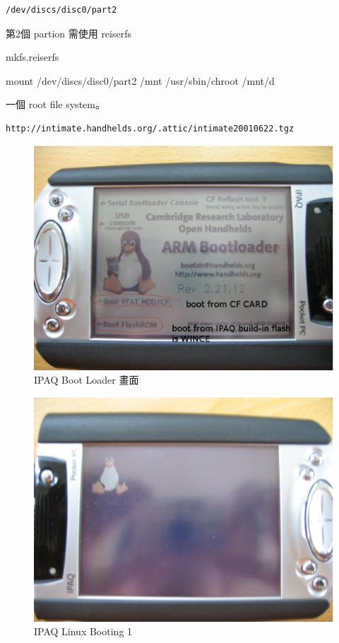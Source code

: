\documentclass[12pt,a4paper]{article}
\begin{document}
\begin{CJK}{UTF8}{bsmi}
\begin{verbatim}
/dev/discs/disc0/part2
\end{verbatim}

第2個 partion 需使用 reiserfs

mkfs.reiserfs

mount /dev/discs/disc0/part2 /mnt
/usr/sbin/chroot /mnt/d

一個 root file system。
\begin{verbatim}
http://intimate.handhelds.org/.attic/intimate20010622.tgz 
\end{verbatim}


\begin{figure}[htbp]
\centering
\includegraphics[scale=0.5]{eps/bootloader.eps}
\caption{IPAQ Boot Loader 畫面}
\end{figure}

\begin{figure}[htbp]
\centering
\includegraphics[scale=0.5]{eps/booting_1.eps}
\caption{IPAQ Linux Booting 1}
\end{figure}


\end{CJK}
\end{document}

